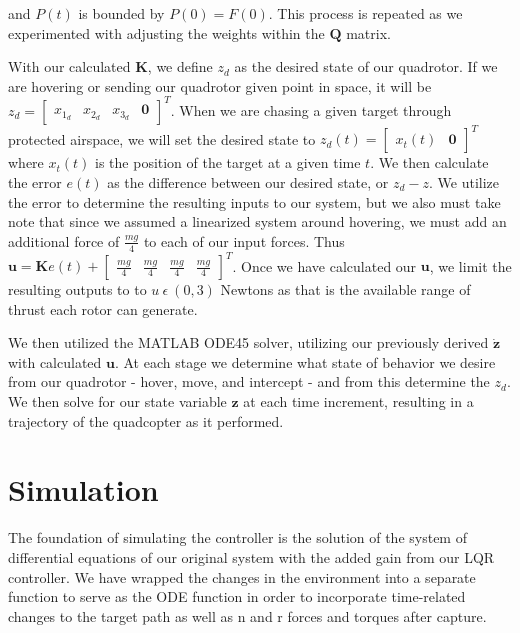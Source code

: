 \documentclass{article}
\begin{document}
\begin{multicols}{2}
\noindent
and $P(t)$ is bounded by $P(0) = F(0)$. This process is repeated as we experimented with adjusting the weights within the $\boldsymbol{Q}$ matrix.

With our calculated $\boldsymbol{K}$, we define $z_d$ as the desired state of our quadrotor. If we are hovering or sending 
our quadrotor given point in space, it will be $z_d=\begin{bmatrix} x_{1_d} & x_{2_d} & x_{3_d} & \boldsymbol{0} 
\end{bmatrix}^T$. When we are chasing a given target through protected airspace, we will set the desired state to 
$z_d(t)=\begin{bmatrix} x_t(t) & \boldsymbol{0} \end{bmatrix}^T$ where $x_t(t)$ is the position of the target at a given time $t$. We then calculate the error $e(t)$ as the difference between our desired state, or $z_d - z$. We utilize the error to 
determine the resulting inputs to our system, but we also must take note that since we assumed a linearized system around 
hovering, we must add an additional force of $\frac{mg}{4}$ to each of our input forces. Thus $\boldsymbol{u}= \boldsymbol{K}e(t) + \begin{bmatrix}\frac{mg}{4} & \frac{mg}{4} & \frac{mg}{4} & \frac{mg}{4}\end{bmatrix}^T$. Once we have calculated our $\boldsymbol{u}$, we limit the resulting outputs to to $u \ \epsilon \ (0, 3)$ Newtons as that is the available range of thrust each rotor can generate.

We then utilized the MATLAB ODE45 solver, utilizing our previously derived $\boldsymbol{\dot{z}}$ with calculated $
\boldsymbol{u}$. At each stage we determine what state of behavior we desire from our quadrotor - hover, move, and intercept - 
and from this determine the $z_d$. We then solve for our state variable $\boldsymbol{z}$ at each time increment, resulting in a trajectory of the quadcopter as it performed.

\section*{Simulation}
\noindent
The foundation of simulating the controller is the solution of the system of differential equations of our original system with the added gain from our LQR controller. We have wrapped the changes in the environment into a separate function to serve as the ODE function in order to incorporate time-related changes to the target path as well as n and r forces and torques after capture.\\


\end{multicols}
\end{document}
